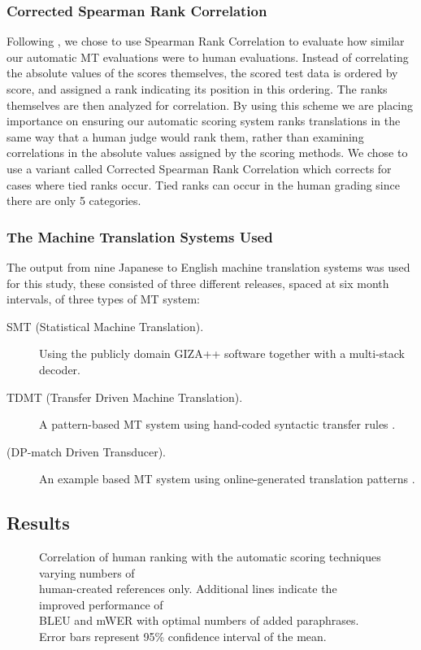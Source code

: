\subsubsection{Corrected Spearman Rank Correlation}

Following \cite{Turian:03}, we chose to use Spearman Rank Correlation to evaluate how similar our automatic MT
evaluations were to human evaluations. Instead of correlating the absolute values of the scores themselves, the
scored test data is ordered by score, and assigned a rank indicating its position in this ordering. The ranks
themselves are then analyzed for correlation. By using this scheme we are placing importance on ensuring our
automatic scoring system ranks translations in the same way that a human judge would rank them, rather than
examining correlations in the absolute values assigned by the scoring methods. We chose to use a variant called
Corrected Spearman Rank Correlation which corrects for cases where tied ranks occur. Tied ranks can occur
in the human grading since there are only 5 categories.

\subsubsection{The Machine Translation Systems Used}
\label{sec:mtsystems}
The output from nine Japanese to English machine
translation systems was used for this study, these
consisted of three different releases, spaced at six
month intervals, of three types of MT system:
\begin{description}
\item[SMT (Statistical Machine Translation).] Using
the publicly domain GIZA++ software \cite{och00:isa} together with a multi-stack decoder.
\item[TDMT (Transfer Driven Machine Translation).]
A pattern-based MT system using hand-coded
syntactic transfer rules \cite{furuse:1996}.
\item[ (DP-match Driven Transducer).] An example based
MT system using online-generated translation
patterns \cite{sumita:2001}.
\end{description}

\subsection{Results}
\label{sec:application:results}

\begin{figure} 
\begin{center}
\textwidth
\mbox{}
\end{center}
\caption{
Correlation of human ranking with the automatic scoring techniques varying numbers of\\
human-created references only. Additional lines indicate the improved performance of\\
BLEU and mWER with optimal numbers of added paraphrases. \\
Error bars represent 95\% confidence interval of the mean.}
\label{fig:blue_nist_edit}
\end{figure}

